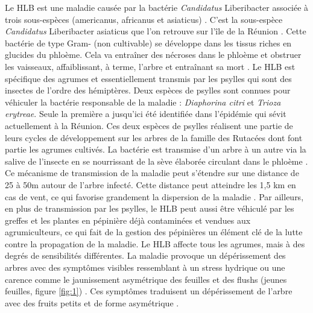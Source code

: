 \documentclass[
  11pt,
  french,
  a4paper,
  extrafontsizes,onecolumn,openright
  ]{memoir}
\begin{document}
Le HLB est une maladie causée par la bactérie \emph{Candidatus} Liberibacter associée à trois sous-espèces (americanus, africanus et asiaticus) \autocite{wang_citrus_2019}. C'est la sous-espèce \emph{Candidatus} Liberibacter asiaticus que l'on retrouve sur l'île de la Réunion \autocite{aubert_greening_1989}. Cette bactérie de type Gram- (non cultivable) se développe dans les tissus riches en glucides du phloème. Cela va entraîner des nécroses dans le phloème et obstruer les vaisseaux, affaiblissant, à terme, l'arbre et entraînant sa mort \autocite{bove_huanglongbing_2006}. Le HLB est spécifique des agrumes et essentiellement transmis par les psylles qui sont des insectes de l'ordre des hémiptères. Deux espèces de psylles sont connues pour véhiculer la bactérie responsable de la maladie : \emph{Diaphorina citri} et \emph{Trioza erytreae}. Seule la première a jusqu'ici été identifiée dans l'épidémie qui sévit actuellement à la Réunion. Ces deux espèces de psylles réalisent une partie de leurs cycles de développement sur les arbres de la famille des Rutacées dont font partie les agrumes cultivés. La bactérie est transmise d'un arbre à un autre via la salive de l'insecte en se nourrissant de la sève élaborée circulant dans le phloème \autocite{narouei-khandan_global_2016}. Ce mécanisme de transmission de la maladie peut s'étendre sur une distance de 25 à 50m autour de l'arbre infecté. Cette distance peut atteindre les 1,5 km en cas de vent, ce qui favorise grandement la dispersion de la maladie \autocite{bove_huanglongbing_2006}. Par ailleurs, en plus de transmission par les psylles, le HLB peut aussi être véhiculé par les greffes et les plantes en pépinière déjà contaminées et vendues aux agrumiculteurs, ce qui fait de la gestion des pépinières un élément clé de la lutte contre la propagation de la maladie.
Le HLB affecte tous les agrumes, mais à des degrés de sensibilités différentes. La maladie provoque un dépérissement des arbres avec des symptômes visibles ressemblant à un stress hydrique ou une carence comme le jaunissement asymétrique des feuilles et des flushs (jeunes feuilles, figure \ref{fig:1}) \autocite{bove_huanglongbing_2006}. Ces symptômes traduisent un dépérissement de l'arbre avec des fruits petits et de forme asymétrique \autocite{gottwald_preliminary_1989}.



\scriptsize
\end{document}
